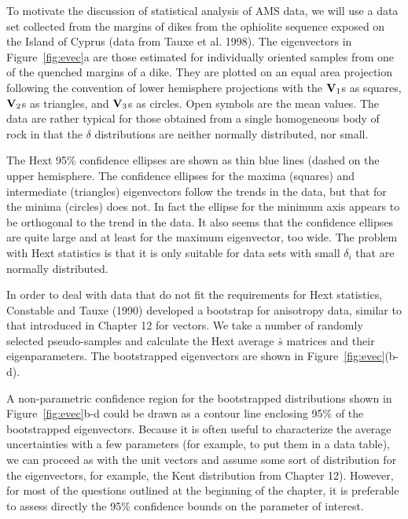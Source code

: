 To motivate the discussion of statistical analysis of AMS data, we will use a data set collected from the margins of dikes from the ophiolite sequence exposed on the Island of Cyprus (data from 
Tauxe et al. 1998).
\nocite{tauxe98b} 
The eigenvectors  in Figure~\ref{fig:evec}a  are those estimated for individually oriented samples from one of the quenched margins of a dike.  They are plotted on an equal area projection following the convention of 
lower hemisphere projections with the $\hbox{\bf V}_1$s as squares, $\hbox{\bf V}_2$s as triangles,
and $\hbox{\bf V}_3$s as circles. Open symbols are the mean values.  
The data are rather typical for those obtained  from a single 
homogeneous body of rock  in that the  $\delta$ distributions are neither 
normally distributed, nor
small.  

The Hext 95\% confidence ellipses are shown as thin blue lines (dashed on the upper hemisphere.    The confidence ellipses for the maxima (squares) and intermediate (triangles) eigenvectors follow the trends in the data, but that for the minima (circles) does not.  In fact the ellipse for the minimum axis appears to be orthogonal to the trend in the data.   It also seems that the confidence ellipses are quite large and at least for the maximum eigenvector, too wide.      The problem with Hext statistics is that it is only suitable for data sets with small $\delta_i$ that are normally distributed.  


 In order to deal with data that do not fit the requirements for Hext statistics, 
 Constable and Tauxe (1990) 
developed a bootstrap for anisotropy data,  similar to that introduced in Chapter 12 for vectors.  We take a number of randomly selected pseudo-samples  and calculate the Hext  average   $\bar s$ matrices and their eigenparameters.  The bootstrapped eigenvectors are shown    in Figure~\ref{fig:evec}(b-d). 

A non-parametric confidence region for the bootstrapped distributions
 shown in Figure~\ref{fig:evec}b-d could  be drawn as 
a contour line enclosing 95\% of the bootstrapped eigenvectors.  
Because it is often useful to characterize the average uncertainties with
a few parameters (for example, to put them in a data table),
 we can proceed as with the unit vectors and assume
some sort of distribution for the eigenvectors, for example,  the Kent distribution from Chapter 12).  However, for most of the questions outlined
at the beginning of the chapter, it is preferable to assess directly  the 
95\% confidence bounds on the parameter of interest.


